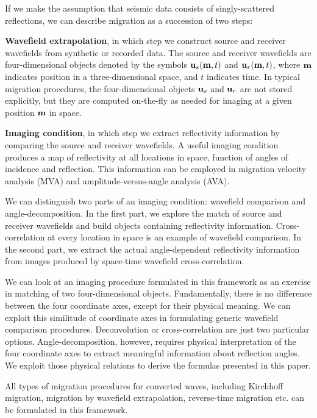 If we make the assumption that seismic data consists
of singly-scattered reflections,
we can describe migration as a succession of two steps:
\par
{\bf Wavefield extrapolation}, in which step we construct
source and receiver wavefields from synthetic or recorded data.
The source and receiver wavefields are four-dimensional objects
denoted by the symbols ${ \bf u}_s({ \bf m},t)$ and ${ \bf u}_r({ \bf m},t)$,
where ${ \bf m}$ indicates position in a three-dimensional space, and
$t$ indicates time.
In typical migration procedures,
the four-dimensional objects ${ \bf u}_s$ and ${ \bf u}_r$ are not stored
explicitly, but they are computed on-the-fly as needed for imaging
at a given position ${ \bf m}$ in space.
\par
{\bf Imaging condition}, in which step we extract reflectivity
information by comparing the source and receiver wavefields.
A useful imaging condition produces a map of reflectivity at all locations
in space, function of angles of incidence and reflection. 
This information can be employed in migration velocity analysis (MVA) 
and amplitude-versus-angle analysis (AVA).

We can distinguish two parts of an imaging condition:
wavefield comparison and angle-decomposition.
In the first part, we explore the match of source and receiver 
wavefields and build objects containing reflectivity information.
Cross-correlation at every location in space is an example of 
wavefield comparison.
In the second part,
we extract the actual angle-dependent reflectivity information
from images produced by space-time wavefield cross-correlation. 

We can look at an imaging procedure formulated in this framework
as an exercise in matching of two four-dimensional objects.
Fundamentally, there is no difference between the four coordinate
axes, except for their physical meaning. We can exploit this similitude
of coordinate axes in formulating generic wavefield comparison procedures.
Deconvolution or cross-correlation are just two particular options.
Angle-decomposition, however, requires physical interpretation of the
four coordinate axes to extract meaningful information about reflection
angles. We exploit those physical relations to derive the formulas
presented in this paper.

All types of migration procedures for converted waves, including 
Kirchhoff migration, 
migration by wavefield extrapolation, 
reverse-time migration etc.
can be formulated in this framework.

